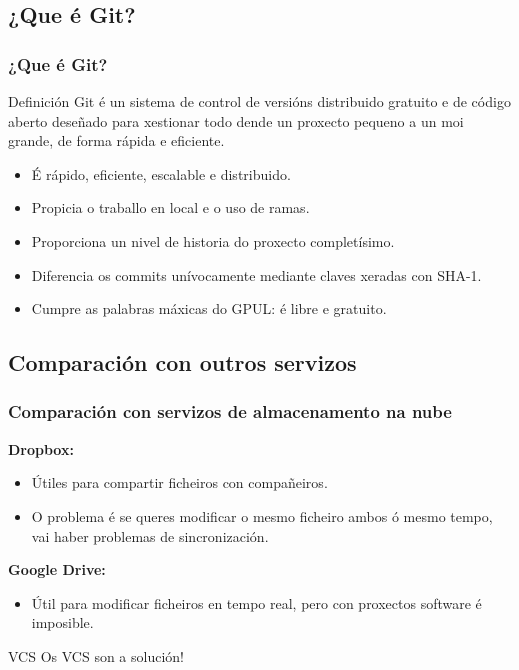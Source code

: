 \subsection{¿Que é Git?}
\begin{frame}
  \frametitle{¿Que é Git?}
  \begin{block}{Definición}
	  Git é un sistema de control de versións distribuido gratuito e de código aberto deseñado para xestionar todo dende un proxecto pequeno a un moi grande, de forma rápida e eficiente.
  \end{block}
  \begin{itemize}
	  \item É rápido, eficiente, escalable e distribuido.
	  \item Propicia o traballo en local e o uso de ramas.
	  \item Proporciona un nivel de historia do proxecto completísimo.
	  \item Diferencia os commits unívocamente mediante claves xeradas con SHA-1.
	  \item Cumpre as palabras máxicas do GPUL: é libre e gratuito.
  \end{itemize}
\end{frame}

\subsection{Comparación con outros servizos}
\begin{frame}
	\scriptsize
  	\frametitle{Comparación con servizos de almacenamento na nube}
	\begin{multicols}{2}
	 \textbf{Dropbox:}
	 \begin{itemize}
	  \item Útiles para compartir ficheiros con compañeiros.
	  \item O problema é se queres modificar o mesmo ficheiro ambos ó mesmo tempo, vai haber problemas de sincronización.
	 \end{itemize}
		\columnbreak
	 \textbf{Google Drive:}
	 \begin{itemize}
	  \item Útil para modificar ficheiros en tempo real, pero con proxectos software é imposible.
	 \end{itemize}
	\end{multicols}
	\begin{alertblock}{VCS}
	  	Os VCS son a solución!
	\end{alertblock}
\end{frame}

